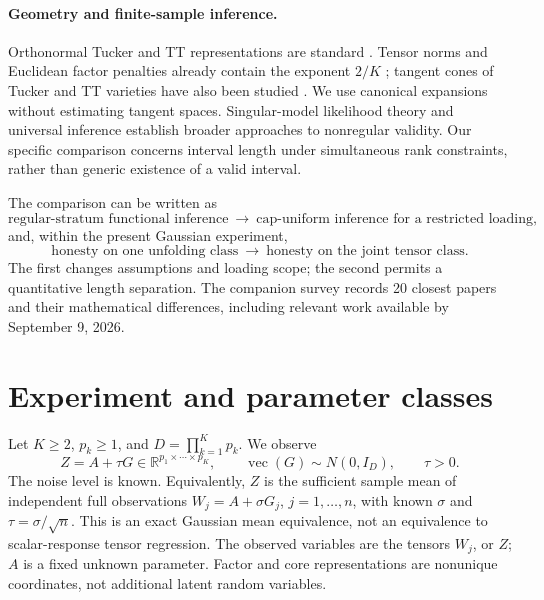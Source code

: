 \documentclass[11pt]{article}
\theoremstyle{remark}
\newcommand{\R}{\mathbb R}
\begin{document}
\paragraph{Geometry and finite-sample inference.}
Orthonormal Tucker and TT representations are standard \citep{delathauwer2000,oseledets2011}. Tensor norms and Euclidean factor penalties already contain the exponent $2/K$ \citep{friedlandlim2018,fan2023}; tangent cones of Tucker and TT varieties have also been studied \citep{gao2025,kutschan2018}. We use canonical expansions without estimating tangent spaces. Singular-model likelihood theory \citep{drton2009} and universal inference \citep{wasserman2020} establish broader approaches to nonregular validity. Our specific comparison concerns interval length under simultaneous rank constraints, rather than generic existence of a valid interval.

The comparison can be written as
\[
 \text{regular-stratum functional inference}
 \ \longrightarrow\ 
 \text{cap-uniform inference for a restricted loading},
\]
and, within the present Gaussian experiment,
\[
 \text{honesty on one unfolding class}
 \ \longrightarrow\
 \text{honesty on the joint tensor class}.
\]
The first changes assumptions and loading scope; the second permits a quantitative length separation. The companion survey records 20 closest papers and their mathematical differences, including relevant work available by September 9, 2026.

\section{Experiment and parameter classes}\label{sec:model}

Let $K\ge2$, $p_k\ge1$, and $D=\prod_{k=1}^K p_k$. We observe
\begin{equation}\label{eq:model}
 Z=A+\tau G\in\R^{p_1\times\cdots\times p_K},\qquad
 \operatorname{vec}(G)\sim N(0,I_D),\qquad \tau>0.
\end{equation}
The noise level is known. Equivalently, $Z$ is the sufficient sample mean of independent full observations $W_j=A+\sigma G_j$, $j=1,\ldots,n$, with known $\sigma$ and $\tau=\sigma/\sqrt n$. This is an exact Gaussian mean equivalence, not an equivalence to scalar-response tensor regression. The observed variables are the tensors $W_j$, or $Z$; $A$ is a fixed unknown parameter. Factor and core representations are nonunique coordinates, not additional latent random variables.
\end{document}
